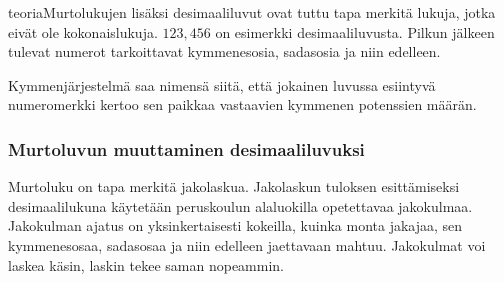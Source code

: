 teoriaMurtolukujen lisäksi desimaaliluvut ovat tuttu tapa merkitä lukuja, jotka eivät ole kokonaislukuja. $123,456$ on esimerkki desimaaliluvusta. Pilkun jälkeen tulevat numerot tarkoittavat kymmenesosia, sadasosia ja niin edelleen.



Kymmenjärjestelmä saa nimensä siitä, että jokainen luvussa esiintyvä numeromerkki kertoo sen paikkaa vastaavien kymmenen potenssien määrän.

\subsubsection*{Murtoluvun muuttaminen desimaaliluvuksi}

Murtoluku on tapa merkitä jakolaskua. Jakolaskun tuloksen esittämiseksi desimaalilukuna käytetään peruskoulun alaluokilla opetettavaa jakokulmaa. Jakokulman ajatus on yksinkertaisesti kokeilla, kuinka monta jakajaa, sen kymmenesosaa, sadasosaa ja niin edelleen jaettavaan mahtuu. Jakokulmat voi laskea käsin, laskin tekee saman nopeammin.


